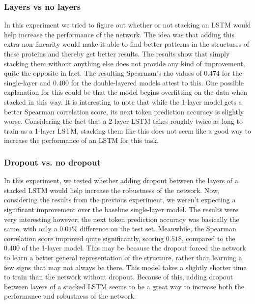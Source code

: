 \subsubsection{Layers vs no layers}
In this experiment we tried to figure out whether or not stacking an LSTM would help increase the performance of the network. The idea was that adding this extra non-linearity would make it able to find better patterns in the structures of these proteins and thereby get better results. The results show that simply stacking them without anything else does not provide any kind of improvement, quite the opposite in fact. The resulting Spearman's rho values of $0.474$ for the single-layer and $0.400$ for the double-layered models attest to this. One possible explanation for this could be that the model begins overfitting on the data when stacked in this way. It is interesting to note that while the 1-layer model gets a better Spearman correlation score, its next token prediction accuracy is slightly worse. Considering the fact that a 2-layer LSTM takes roughly twice as long to train as a 1-layer LSTM, stacking them like this does not seem like a good way to increase the performance of an LSTM for this task.

\subsubsection{Dropout vs. no dropout}
In this experiment, we tested whether adding dropout between the layers of a stacked LSTM would help increase the robustness of the network. Now, considering the results from the previous experiment, we weren't expecting a significant improvement over the baseline single-layer model. The results were very interesting however; the next token prediction accuracy was basically the same, with only a $0.01\%$ difference on the test set. Meanwhile, the Spearman correlation score improved quite significantly, scoring $0.518$, compared to the $0.400$ of the 1-layer model. This may be because the dropout forced the network to learn a better general representation of the structure, rather than learning a few signs that may not always be there. This model takes a slightly shorter time to train than the network without dropout. Because of this, adding dropout between layers of a stacked LSTM seems to be a great way to increase both the performance and robustness of the network.

